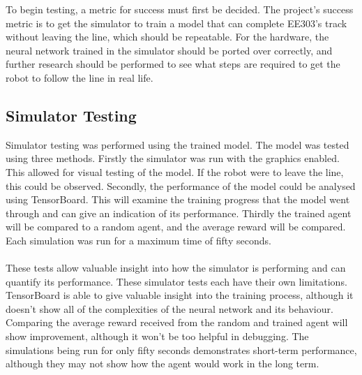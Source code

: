 \documentclass[a4paper,12pt]{article}
\begin{document}

To begin testing, a metric for success must first be decided. The project's success metric is to get the simulator to train a model that can complete EE303's track without leaving the line, which should be repeatable. For the hardware, the neural network trained in the simulator should be ported over correctly, and further research should be performed to see what steps are required to get the robot to follow the line in real life. 
\subsection{Simulator Testing}
Simulator testing was performed using the trained model. The model was tested using three methods. Firstly the simulator was run with the graphics enabled. This allowed for visual testing of the model. If the robot were to leave the line, this could be observed. Secondly, the performance of the model could be analysed using TensorBoard. This will examine the training progress that the model went through and can give an indication of its performance. Thirdly the trained agent will be compared to a random agent, and the average reward will be compared. Each simulation was run for a maximum time of fifty seconds.
\\\\
These tests allow valuable insight into how the simulator is performing and can quantify its performance. These simulator tests each have their own limitations. TensorBoard is able to give valuable insight into the training process, although it doesn't show all of the complexities of the neural network and its behaviour. Comparing the average reward received from the random and trained agent will show improvement, although it won't be too helpful in debugging. The simulations being run for only fifty seconds demonstrates short-term performance, although they may not show how the agent would work in the long term. 
\end{document}
